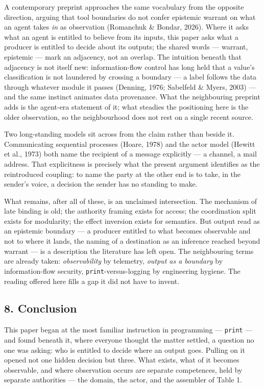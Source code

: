 \documentclass[
]{article}
\begin{document}
A contemporary preprint approaches the same vocabulary from the opposite
direction, arguing that tool boundaries do not confer epistemic warrant
on what an agent takes \emph{in} as observation (Romanchuk \& Bondar,
2026). Where it asks what an agent is entitled to believe from its
inputs, this paper asks what a producer is entitled to decide about its
outputs; the shared words --- warrant, epistemic --- mark an adjacency,
not an overlap. The intuition beneath that adjacency is not itself new:
information-flow control has long held that a value's classification is
not laundered by crossing a boundary --- a label follows the data
through whatever module it passes (Denning, 1976; Sabelfeld \& Myers,
2003) --- and the same instinct animates data provenance. What the
neighbouring preprint adds is the agent-era statement of it; what
steadies the positioning here is the older observation, so the
neighbourhood does not rest on a single recent source.

Two long-standing models sit across from the claim rather than beside
it. Communicating sequential processes (Hoare, 1978) and the actor model
(Hewitt et al., 1973) both name the recipient of a message explicitly
--- a channel, a mail address. That explicitness is precisely what the
present argument identifies as the reintroduced coupling: to name the
party at the other end is to take, in the sender's voice, a decision the
sender has no standing to make.

What remains, after all of these, is an unclaimed intersection. The
mechanism of late binding is old; the authority framing exists for
access; the coordination split exists for modularity; the effect
inversion exists for semantics. But output read as an epistemic boundary
--- a producer entitled to what becomes observable and not to where it
lands, the naming of a destination as an inference reached beyond
warrant --- is a description the literature has left open. The
neighbouring terms are already taken: \emph{observability} by telemetry,
\emph{output as a boundary} by information-flow security,
\texttt{print}-versus-logging by engineering hygiene. The reading
offered here fills a gap it did not have to invent.

\subsection{8. Conclusion}\label{conclusion}

This paper began at the most familiar instruction in programming ---
\texttt{print} --- and found beneath it, where everyone thought the
matter settled, a question no one was asking: who is entitled to decide
where an output goes. Pulling on it opened not one hidden decision but
three. What exists, what of it becomes observable, and where observation
occurs are separate competences, held by separate authorities --- the
domain, the actor, and the assembler of Table 1.
\end{document}
